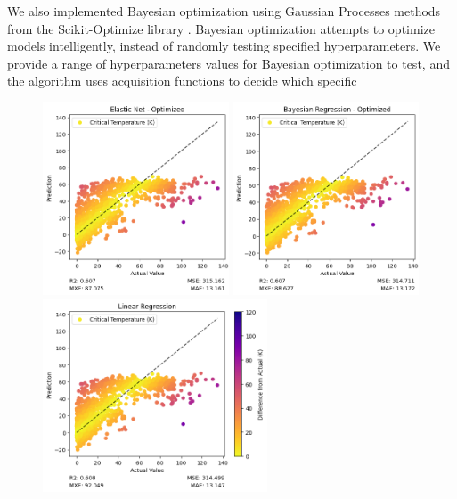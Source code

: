 \documentclass[twocolumn, nofootinbib, secnumarabic, amssymb, nobibnotes, aps, prd]{revtex4-2}
\begin{document}
We also implemented Bayesian optimization using Gaussian Processes methods from the Scikit-Optimize library \cite{head_tim_2021_5565057}. Bayesian optimization attempts to optimize models intelligently, instead of randomly testing specified hyperparameters. We provide a range of hyperparameters values for Bayesian optimization to test, and the algorithm uses acquisition functions to decide which specific

\begin{figure}[t] %
   \centering
   \includegraphics[height=2.25in]{images/subfigures/no_uncertainty/elastic_net_optimized.png}
   \includegraphics[height=2.25in]{images/subfigures/no_uncertainty/bayesian_regression_optimized.png}
   \includegraphics[height=2.25in]{images/subfigures/no_uncertainty/linear_regression.png}

\end{figure}
\end{document}
